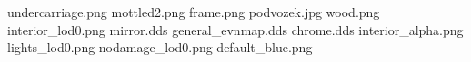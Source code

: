 undercarriage.png
mottled2.png
frame.png
podvozek.jpg
wood.png
interior_lod0.png
mirror.dds
general_evnmap.dds
chrome.dds
interior_alpha.png
lights_lod0.png
nodamage_lod0.png
default_blue.png
